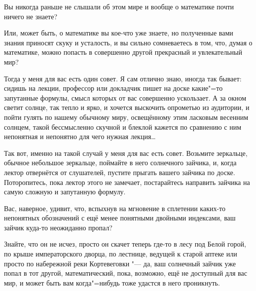 Вы никогда раньше не слышали об этом мире и вообще о математике почти ничего
не знаете?

Или, может быть, о математике вы кое-что уже знаете, но полученные вами знания
приносят скуку и усталость, и вы сильно сомневаетесь в том, что, думая о
математике, можно попасть в совершенно другой прекрасный и увлекательный мир?

Тогда у меня для вас есть один совет.
Я сам отлично знаю, иногда так бывает: сидишь на лекции, профессор или докладчик
пишет на доске какие"=то запутанные формулы, смысл которых от вас совершенно
ускользает.
А за окном светит солнце, так тепло и ярко, и хочется выскочить опрометью из
аудитории, и пойти гулять по нашему обычному миру, освещённому этим ласковым
весенним солнцем, такой бессмысленно скучной и блеклой кажется по сравнению с
ним непонятная и непонятно для чего нужная лекция\ldots

Так вот, именно на такой случай у меня для вас есть совет.
Возьмите зеркальце, обычное небольшое зеркальце, поймайте в него солнечного
зайчика, и, когда лектор отвернётся от слушателей, пустите прыгать вашего
зайчика по доске.
Поторопитесь, пока лектор этого не замечает, постарайтесь направить зайчика на
самую сложную и запутанную формулу.

Вас, наверное, удивит, что, вспыхнув на мгновение в сплетении каких-то
непонятных обозначений с ещё менее понятными двойными индексами, ваш зайчик
куда-то неожиданно пропал?

Знайте, что он не исчез, просто он скачет теперь где-то в лесу под Белой горой,
по крыше императорского дворца, по лестнице, ведущей к старой аптеке или просто
по набережной реки Кортевеговки "--- да, ваш солнечный зайчик уже попал в тот
другой, математический, пока, возможно, ещё не доступный для вас мир, и может
быть вам когда"=нибудь тоже удастся в него проникнуть.
